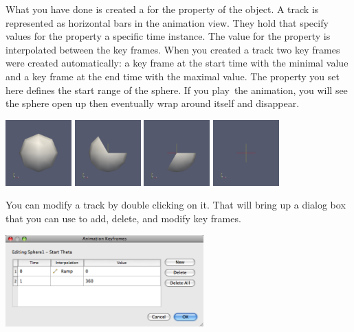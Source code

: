 What you have done is created a  for the 
property of the  object.  A track is represented as horizontal
bars in the animation view.  They hold  that specify
values for the property a specific time instance.  The value for the
property is interpolated between the key frames.  When you created a track
two key frames were created automatically: a key frame at the start time
with the minimal value and a key frame at the end time with the maximal
value.  The property you set here defines the start range of the sphere.
If you play~\vcrPlay the animation, you will see the sphere open up then
eventually wrap around itself and disappear.

\begin{inlinefig}
  \includegraphics[width=1in]{images/AnimateSphere0}
  \includegraphics[width=1in]{images/AnimateSphere1}
  \includegraphics[width=1in]{images/AnimateSphere2}
  \includegraphics[width=1in]{images/AnimateSphere3}
\end{inlinefig}

You can modify a track by double clicking on it.  That will bring up a
dialog box that you can use to add, delete, and modify key frames.

\begin{inlinefig}
  \includegraphics[width=3in]{images/AnimationKeyframesDialog}
\end{inlinefig}

